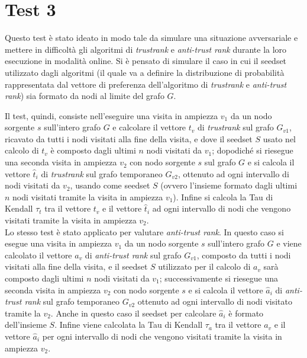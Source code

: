 \section{Test 3}
Questo test è stato ideato in modo tale da simulare una situazione avversariale e mettere in difficoltà gli algoritmi di \textit{trustrank} e \textit{anti-trust rank} durante la loro esecuzione in modalità online. Si è pensato di simulare il caso in cui il seedset  utilizzato dagli algoritmi (il quale va a definire la distribuzione di probabilità rappresentata dal vettore di preferenza dell'algoritmo di \textit{trustrank} e \textit{anti-trust rank}) sia formato da nodi al limite del grafo \(G\).

Il test, quindi, consiste nell'eseguire una visita in ampiezza \(v_1\) da un nodo sorgente \(s\)  sull'intero grafo \(G\) e calcolare il vettore \(t_v\) di \textit{trustrank} sul grafo \(G_{v1}\), ricavato da tutti i nodi visitati alla fine della visita,  e dove il seedset \(S\) usato nel calcolo di \(t_v\) è composto dagli ultimi \(n\) nodi visitati da \(v_1\); dopodiché  si riesegue una seconda visita in ampiezza \(v_2\) con nodo sorgente \(s\) sul grafo \(G\) e si calcola il vettore \(\hat{t}_i\) di \textit{trustrank} sul grafo temporaneo \(G_{v2}\), ottenuto ad ogni intervallo di nodi visitati da \(v_2\), usando  come seedset \(S\) (ovvero l'insieme formato dagli ultimi \(n\) nodi visitati tramite la visita in ampiezza \(v_1\)).  Infine si calcola la Tau di Kendall \(\tau_t\) tra il vettore \(t_v\) e il vettore \(\hat{t}_i\) ad ogni intervallo di nodi che vengono visitati tramite la visita in ampiezza \(v_2\).\\
Lo stesso test è stato applicato per valutare \textit{anti-trust rank}. In questo caso si esegue una visita in ampiezza \(v_1\) da un nodo sorgente \(s\) sull'intero grafo \(G\) e viene calcolato il vettore \(a_v\) di \textit{anti-trust rank} sul grafo \(G_{v1}\), composto da tutti i nodi visitati alla fine della visita, e  il seedset \(S\) utilizzato per il calcolo di \(a_v\) sarà composto dagli ultimi \(n\) nodi visitati da \(v_1\); successivamente si riesegue una seconda visita in ampiezza \(v_2\) con nodo sorgente \(s\) e si calcola il vettore \(\hat{a}_i\) di \textit{anti-trust rank} sul grafo temporaneo \(G_{v2}\) ottenuto ad ogni intervallo di nodi visitato tramite la \(v_2\). Anche in questo caso il seedset per calcolare \(\hat{a}_i\) è formato dell'insieme \(S\). Infine  viene calcolata la Tau di Kendall \(\tau_a\) tra il vettore \(a_v\) e il vettore \(\hat{a}_i\) per ogni intervallo di nodi che vengono visitati tramite la visita in ampiezza \(v_2\).\\
